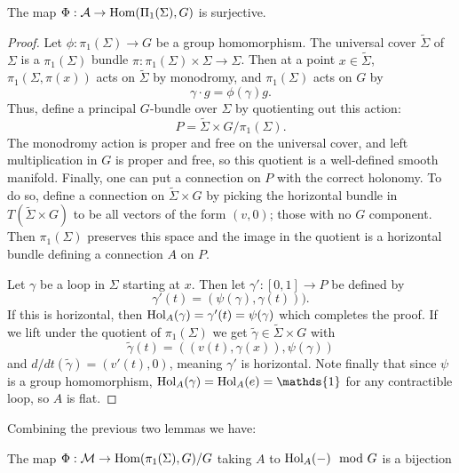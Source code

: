 	\begin{lemma}
			The map $\Phi:\mathcal{A} \to \text{Hom}(\Pi_1(\Sigma),G)$ is surjective.
	\end{lemma}
	\begin{proof}
		Let $\phi:\pi_1(\Sigma)\to G$ be a group homomorphism. The universal cover $\tilde{\Sigma}$ of $\Sigma$ is a $\pi_1(\Sigma)$ bundle $\pi:\pi_1(\Sigma)\times \Sigma \to \Sigma$. Then at a point $x\in \tilde{\Sigma}$, $\pi_1(\Sigma, \pi(x))$ acts on $\tilde{\Sigma}$ by monodromy, and $\pi_1(\Sigma)$ acts on $G$ by
		\begin{equation}
			\gamma \cdot g = \phi(\gamma) g.
		\end{equation}
		Thus, define a principal $G$-bundle over $\Sigma$ by quotienting out this action:
		\begin{equation}
			P = \tilde{\Sigma} \times G / \pi_1(\Sigma).
		\end{equation}
		The monodromy action is proper and free on the universal cover, and left multiplication in $G$ is proper and free, so this quotient is a well-defined smooth manifold. Finally, one can put a connection on $P$ with the correct holonomy. To do so, define a connection on $\tilde{\Sigma}\times G$ by picking the horizontal bundle in $T(\tilde{\Sigma}\times G)$ to be all vectors of the form $(v, 0)$; those with no $G$ component. Then $\pi_1(\Sigma)$ preserves this space and the image in the quotient is a horizontal bundle defining a connection $A$ on $P$. 
		
		Let $\gamma$ be a loop in $\Sigma$ starting at $x$. Then let $\gamma':[0,1]\to P$ be defined by
		\begin{equation}
			\gamma'(t) = (\psi(\gamma), \gamma(t))).
		\end{equation}
		If this is horizontal, then $\text{Hol}_A(\gamma) = \gamma'(t) = \psi(\gamma)$ which completes the proof. If we lift under the quotient of $\pi_1(\Sigma)$ we get $\tilde{\gamma} \in \tilde{\Sigma}\times G$ with
		\begin{equation}
			\tilde{\gamma}(t) = ((v(t),\gamma(x)), \psi(\gamma))
		\end{equation}
		and $d/dt(\tilde{\gamma}) = (v'(t), 0)$, meaning $\gamma'$ is horizontal. Note finally that since $\psi$ is a group homomorphism, $\Hol_A(\gamma) = \Hol_A(e) = \mathds{1}$ for any contractible loop, so $A$ is flat.
	\end{proof}
	Combining the previous two lemmas we have:
	\begin{theorem}
		\label{t:phi-bijection}
		The map $\Phi:\mathcal{M} \to \text{Hom}(\pi_1(\Sigma), G)/G$ taking $A$ to $\text{Hol}_A(-) \mod G$ is a bijection
	\end{theorem}
